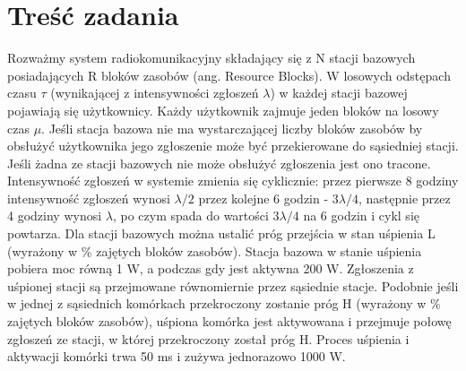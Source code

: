 \section{Treść zadania}
Rozważmy system radiokomunikacyjny składający się z N stacji bazowych posiadających R bloków zasobów (ang. Resource Blocks). W losowych odstępach czasu $\tau$ (wynikającej z intensywności zgłoszeń $\lambda$) w każdej stacji bazowej pojawiają się użytkownicy. Każdy użytkownik zajmuje jeden bloków na losowy czas $\mu$. Jeśli stacja bazowa nie ma wystarczającej liczby bloków zasobów by obsłużyć użytkownika jego zgłoszenie może być przekierowane do sąsiedniej stacji. Jeśli żadna ze stacji bazowych nie może obsłużyć zgłoszenia jest ono tracone. Intensywność zgłoszeń w systemie zmienia się cyklicznie: przez pierwsze 8 godziny intensywność zgłoszeń wynosi $\lambda / 2$ przez kolejne 6 godzin - $3\lambda / 4$, następnie przez 4 godziny wynosi $\lambda$, po czym spada do wartości $3\lambda / 4$ na 6 godzin i cykl się powtarza. Dla stacji bazowych można ustalić próg przejścia w stan uśpienia L (wyrażony w \% zajętych bloków zasobów). Stacja bazowa w stanie uśpienia pobiera moc równą 1 W, a podczas gdy jest aktywna 200 W. Zgłoszenia z uśpionej stacji są przejmowane równomiernie przez sąsiednie stacje. Podobnie jeśli w jednej z sąsiednich komórkach przekroczony zostanie próg H (wyrażony w \% zajętych bloków zasobów), uśpiona komórka jest aktywowana i przejmuje połowę zgłoszeń ze stacji, w której przekroczony został próg H. Proces uśpienia i aktywacji komórki trwa 50 ms i zużywa jednorazowo 1000 W.
